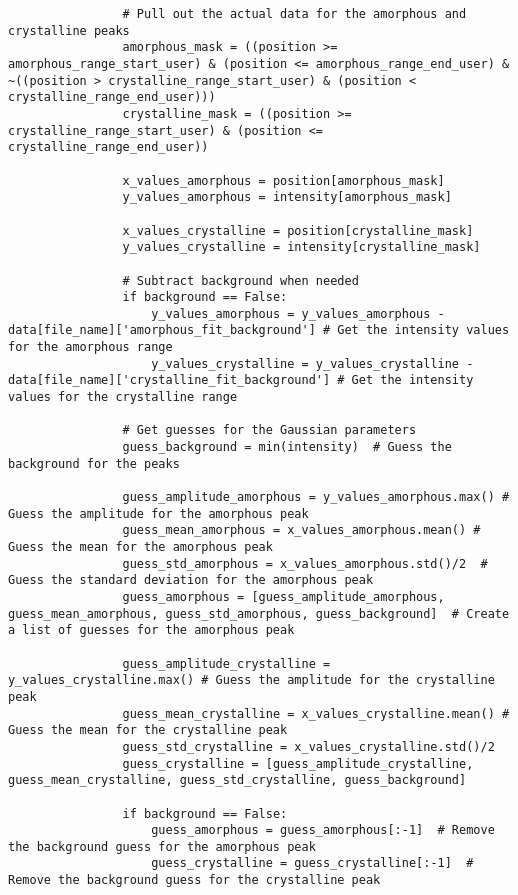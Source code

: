 \begin{lstlisting}
                # Pull out the actual data for the amorphous and crystalline peaks
                amorphous_mask = ((position >= amorphous_range_start_user) & (position <= amorphous_range_end_user) & ~((position > crystalline_range_start_user) & (position < crystalline_range_end_user)))
                crystalline_mask = ((position >= crystalline_range_start_user) & (position <= crystalline_range_end_user))

                x_values_amorphous = position[amorphous_mask]
                y_values_amorphous = intensity[amorphous_mask]

                x_values_crystalline = position[crystalline_mask]
                y_values_crystalline = intensity[crystalline_mask]

                # Subtract background when needed
                if background == False:
                    y_values_amorphous = y_values_amorphous - data[file_name]['amorphous_fit_background'] # Get the intensity values for the amorphous range
                    y_values_crystalline = y_values_crystalline - data[file_name]['crystalline_fit_background'] # Get the intensity values for the crystalline range

                # Get guesses for the Gaussian parameters
                guess_background = min(intensity)  # Guess the background for the peaks

                guess_amplitude_amorphous = y_values_amorphous.max() # Guess the amplitude for the amorphous peak
                guess_mean_amorphous = x_values_amorphous.mean() # Guess the mean for the amorphous peak
                guess_std_amorphous = x_values_amorphous.std()/2  # Guess the standard deviation for the amorphous peak
                guess_amorphous = [guess_amplitude_amorphous, guess_mean_amorphous, guess_std_amorphous, guess_background]  # Create a list of guesses for the amorphous peak

                guess_amplitude_crystalline = y_values_crystalline.max() # Guess the amplitude for the crystalline peak
                guess_mean_crystalline = x_values_crystalline.mean() # Guess the mean for the crystalline peak
                guess_std_crystalline = x_values_crystalline.std()/2
                guess_crystalline = [guess_amplitude_crystalline, guess_mean_crystalline, guess_std_crystalline, guess_background]

                if background == False:
                    guess_amorphous = guess_amorphous[:-1]  # Remove the background guess for the amorphous peak
                    guess_crystalline = guess_crystalline[:-1]  # Remove the background guess for the crystalline peak


\end{lstlisting}
